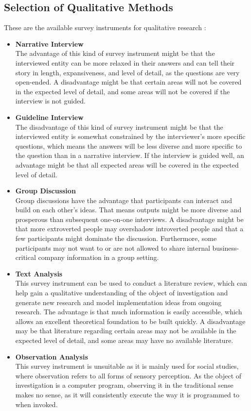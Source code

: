 \documentclass[draft,final]{thesisclass} %
\begin{document}
\subsection{Selection of Qualitative Methods}
These are the available survey instruments for qualitative research \parencite[15-16]{sw_du_krems}:
\begin{itemize}
    \item \textbf{Narrative Interview}\\
    The advantage of this kind of survey instrument might be that the interviewed entity can be more relaxed in their answers and can tell their story in length, expansiveness, and level of detail, as the questions are very open-ended.
    A disadvantage might be that certain areas will not be covered in the expected level of detail, and some areas will not be covered if the interview is not guided.
    \item \textbf{Guideline Interview}\\
    The disadvantage of this kind of survey instrument might be that the interviewed entity is somewhat constrained by the interviewer's more specific questions, which means the answers will be less diverse and more specific to the question than in a narrative interview.
    If the interview is guided well, an advantage might be that all expected areas will be covered in the expected level of detail.
    \item \textbf{Group Discussion}\\
    Group discussions have the advantage that participants can interact and build on each other's ideas.
    That means outputs might be more diverse and prosperous than subsequent one-on-one interviews.
    A disadvantage might be that more extroverted people may overshadow introverted people and that a few participants might dominate the discussion.
    Furthermore, some participants may not want to or are not allowed to share internal business-critical company information in a group setting.
    \item \textbf{Text Analysis}\\
    This survey instrument can be used to conduct a literature review, which can help gain a qualitative understanding of the object of investigation and generate new research and model implementation ideas from ongoing research.
    The advantage is that much information is easily accessible, which allows an excellent theoretical foundation to be built quickly.
    A disadvantage may be that literature regarding certain areas may not be available in the expected level of detail, and some areas may have no available literature.
    \item \textbf{Observation Analysis}\\
    This survey instrument is unsuitable as it is mainly used for social studies, where observation refers to all forms of sensory perception.
    As the object of investigation is a computer program, observing it in the traditional sense makes no sense, as it will consistently execute the way it is programmed to when invoked.
\end{itemize}
\end{document}
